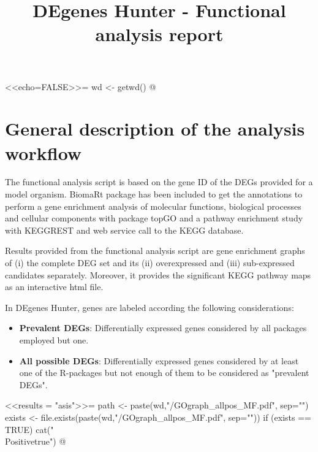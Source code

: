 \documentclass{article}
\begin{document}
<<echo=FALSE>>=
wd <- getwd()
@


\title{DEgenes Hunter - Functional analysis report}
	\maketitle


\section{General description of the analysis workflow}


The functional analysis script is based on the gene ID of the DEGs provided for a model organism. BiomaRt package has been included to get the annotations to perform a gene enrichment analysis of molecular functions, biological processes and cellular components with package topGO and a pathway enrichment study with KEGGREST and web service call to the KEGG database. 

Results provided from the functional analysis script are gene enrichment graphs of (i) the complete DEG set and its (ii) overexpressed and (iii) sub-expressed candidates separately. Moreover, it provides the significant KEGG pathway maps as an interactive html file.



In DEgenes Hunter, genes are labeled according the following considerations:
  \begin{itemize}
         \item {\bf Prevalent DEGs}: Differentially expressed genes considered by all packages employed but one.
         \item {\bf All possible DEGs}: Differentially expressed genes considered by at least one of the R-packages but not enough of them to be considered as "prevalent DEGs".
  \end{itemize}




\newif\ifPositive

<<results = "asis">>=
path <- paste(wd,"/GOgraph_allpos_MF.pdf", sep="")
exists <- file.exists(paste(wd,"/GOgraph_allpos_MF.pdf", sep=""))
if (exists == TRUE) {
  cat("\\Positivetrue")
}
@

\ifPositive
 \section{GO graphs of all possible DEGs: Molecular Functions (MF)}
 \subsection{General GOgraph of all possible DEGs}
 This is the GO graph provided by the topGO package (Image extracted from {\bf"GOgraph\_allpos\_MF.pdf"} file):
  \begin{center}
    \texttt{[image: \\Sexpr\{path]}}
  \end{center}
\fi
\end{document}
